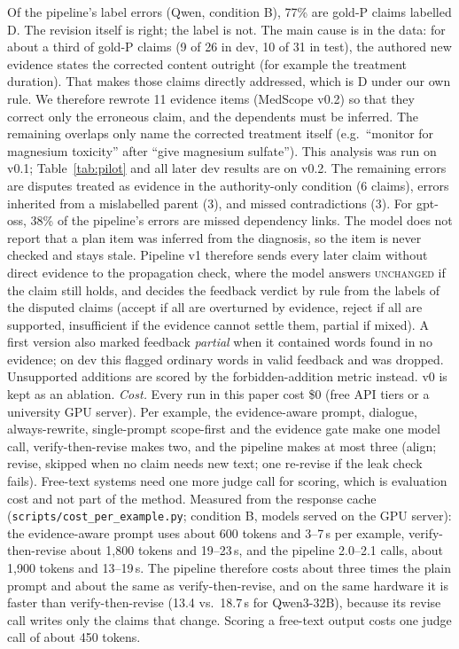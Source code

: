 \documentclass[11pt]{article}
\newcommand{\D}{\textsc{D}}
\newcommand{\Pp}{\textsc{P}}
\newcommand{\ms}{MedScope}
\begin{document}
Of the pipeline's label errors (Qwen, condition B), 77\% are gold-\Pp{} claims labelled \D{}. The revision itself is right; the label is not. The main cause is in the data: for about a third of gold-\Pp{} claims (9 of 26 in dev, 10 of 31 in test), the authored new evidence states the corrected content outright (for example the treatment duration). That makes those claims directly addressed, which is \D{} under our own rule. We therefore rewrote 11 evidence items (\ms{} v0.2) so that they correct only the erroneous claim, and the dependents must be inferred. The remaining overlaps only name the corrected treatment itself (e.g.\ ``monitor for magnesium toxicity'' after ``give magnesium sulfate''). This analysis was run on v0.1; Table~\ref{tab:pilot} and all later dev results are on v0.2. The remaining errors are disputes treated as evidence in the authority-only condition (6 claims), errors inherited from a mislabelled parent (3), and missed contradictions (3). For gpt-oss, 38\% of the pipeline's errors are missed dependency links. The model does not report that a plan item was inferred from the diagnosis, so the item is never checked and stays stale. Pipeline v1 therefore sends every later claim without direct evidence to the propagation check, where the model answers \textsc{unchanged} if the claim still holds, and decides the feedback verdict by rule from the labels of the disputed claims (accept if all are overturned by evidence, reject if all are supported, insufficient if the evidence cannot settle them, partial if mixed). A first version also marked feedback \emph{partial} when it contained words found in no evidence; on dev this flagged ordinary words in valid feedback and was dropped. Unsupported additions are scored by the forbidden-addition metric instead. v0 is kept as an ablation. \emph{Cost.} Every run in this paper cost \$0 (free API tiers or a university GPU server). Per example, the evidence-aware prompt, dialogue, always-rewrite, single-prompt scope-first and the evidence gate make one model call, verify-then-revise makes two, and the pipeline makes at most three (align; revise, skipped when no claim needs new text; one re-revise if the leak check fails). Free-text systems need one more judge call for scoring, which is evaluation cost and not part of the method. Measured from the response cache (\texttt{scripts/cost\_per\_example.py}; condition B, models served on the GPU server): the evidence-aware prompt uses about 600 tokens and 3--7\,s per example, verify-then-revise about 1{,}800 tokens and 19--23\,s, and the pipeline 2.0--2.1 calls, about 1{,}900 tokens and 13--19\,s. The pipeline therefore costs about three times the plain prompt and about the same as verify-then-revise, and on the same hardware it is faster than verify-then-revise (13.4 vs.\ 18.7\,s for Qwen3-32B), because its revise call writes only the claims that change. Scoring a free-text output costs one judge call of about 450 tokens.
\end{document}
